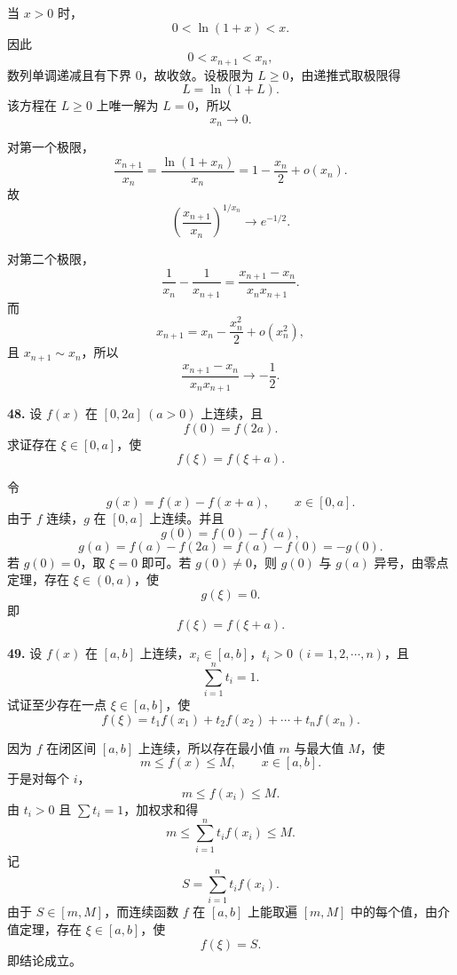 \begin{solutionblock}
当 \(x>0\) 时，
\[
0<\ln(1+x)<x.
\]
因此
\[
0<x_{n+1}<x_n,
\]
数列单调递减且有下界 0，故收敛。设极限为 \(L\ge0\)，由递推式取极限得
\[
L=\ln(1+L).
\]
该方程在 \(L\ge0\) 上唯一解为 \(L=0\)，所以
\[
x_n\to0.
\]

对第一个极限，
\[
\frac{x_{n+1}}{x_n}
=\frac{\ln(1+x_n)}{x_n}
=1-\frac{x_n}{2}+o(x_n).
\]
故
\[
\left(\frac{x_{n+1}}{x_n}\right)^{1/x_n}\to e^{-1/2}.
\]

对第二个极限，
\[
\frac1{x_n}-\frac1{x_{n+1}}
=\frac{x_{n+1}-x_n}{x_nx_{n+1}}.
\]
而
\[
x_{n+1}=x_n-\frac{x_n^2}{2}+o(x_n^2),
\]
且 \(x_{n+1}\sim x_n\)，所以
\[
\frac{x_{n+1}-x_n}{x_nx_{n+1}}
\to -\frac12.
\]
\end{solutionblock}

\begin{problemblock}
\textbf{48.} 设 \(f(x)\) 在 \([0,2a]\ (a>0)\) 上连续，且
\[
f(0)=f(2a).
\]
求证存在 \(\xi\in[0,a]\)，使
\[
f(\xi)=f(\xi+a).
\]
\end{problemblock}

\begin{solutionblock}
令
\[
g(x)=f(x)-f(x+a),\qquad x\in[0,a].
\]
由于 \(f\) 连续，\(g\) 在 \([0,a]\) 上连续。并且
\[
g(0)=f(0)-f(a),
\]
\[
g(a)=f(a)-f(2a)=f(a)-f(0)=-g(0).
\]
若 \(g(0)=0\)，取 \(\xi=0\) 即可。若 \(g(0)\ne0\)，则 \(g(0)\) 与 \(g(a)\) 异号，由零点定理，存在 \(\xi\in(0,a)\)，使
\[
g(\xi)=0.
\]
即
\[
f(\xi)=f(\xi+a).
\]
\end{solutionblock}

\begin{problemblock}
\textbf{49.} 设 \(f(x)\) 在 \([a,b]\) 上连续，\(x_i\in[a,b]\)，\(t_i>0\ (i=1,2,\cdots,n)\)，且
\[
\sum_{i=1}^n t_i=1.
\]
试证至少存在一点 \(\xi\in[a,b]\)，使
\[
f(\xi)=t_1f(x_1)+t_2f(x_2)+\cdots+t_nf(x_n).
\]
\end{problemblock}

\begin{solutionblock}
因为 \(f\) 在闭区间 \([a,b]\) 上连续，所以存在最小值 \(m\) 与最大值 \(M\)，使
\[
m\le f(x)\le M,\qquad x\in[a,b].
\]
于是对每个 \(i\)，
\[
m\le f(x_i)\le M.
\]
由 \(t_i>0\) 且 \(\sum t_i=1\)，加权求和得
\[
m\le \sum_{i=1}^n t_if(x_i)\le M.
\]
记
\[
S=\sum_{i=1}^n t_if(x_i).
\]
由于 \(S\in[m,M]\)，而连续函数 \(f\) 在 \([a,b]\) 上能取遍 \([m,M]\) 中的每个值，由介值定理，存在 \(\xi\in[a,b]\)，使
\[
f(\xi)=S.
\]
即结论成立。
\end{solutionblock}

